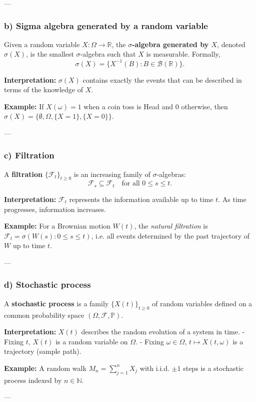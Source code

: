 \documentclass[12pt,a4paper]{book}
\theoremstyle{remark}
\newcommand{\PP}{\mathbb{P}}          %
\newcommand{\RR}{\mathbb{R}}
\newcommand{\NN}{\mathbb{N}}
\newcommand{\F}{\mathcal{F}}          %
\begin{document}
---

\subsubsection*{b) Sigma algebra generated by a random variable}
Given a random variable $X:\Omega \to \RR$, the \textbf{$\sigma$-algebra generated by $X$}, denoted $\sigma(X)$, is the smallest $\sigma$-algebra such that $X$ is measurable. Formally,
\[
\sigma(X) = \{ X^{-1}(B) : B \in \mathcal{B}(\RR)\}.
\]

\textbf{Interpretation:} $\sigma(X)$ contains exactly the events that can be described in terms of the knowledge of $X$.

\textbf{Example:} If $X(\omega)=1$ when a coin toss is Head and $0$ otherwise, then $\sigma(X)=\{\emptyset, \Omega, \{X=1\}, \{X=0\}\}$.

---

\subsubsection*{c) Filtration}
A \textbf{filtration} $\{\F_t\}_{t\ge0}$ is an increasing family of $\sigma$-algebras:
\[
\F_s \subseteq \F_t \quad \text{for all } 0 \leq s \leq t.
\]

\textbf{Interpretation:} $\F_t$ represents the information available up to time $t$. As time progresses, information increases.  

\textbf{Example:} For a Brownian motion $W(t)$, the \emph{natural filtration} is $\F_t=\sigma(W(s):0\leq s \leq t)$, i.e. all events determined by the past trajectory of $W$ up to time $t$.

---

\subsubsection*{d) Stochastic process}
A \textbf{stochastic process} is a family $\{X(t)\}_{t\ge0}$ of random variables defined on a common probability space $(\Omega, \F, \PP)$.  

\textbf{Interpretation:} $X(t)$ describes the random evolution of a system in time.  
- Fixing $t$, $X(t)$ is a random variable on $\Omega$.  
- Fixing $\omega \in \Omega$, $t \mapsto X(t,\omega)$ is a trajectory (sample path).

\textbf{Example:} A random walk $M_n=\sum_{j=1}^n X_j$ with i.i.d. $\pm1$ steps is a stochastic process indexed by $n\in\NN$.

---
\end{document}
